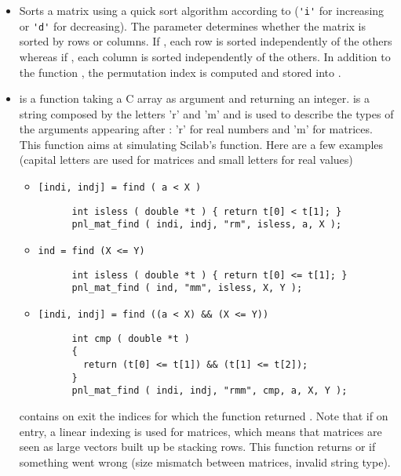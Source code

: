 \begin{itemize}
\item {}
  \sshortdescribe Sorts a matrix using a quick sort algorithm according to
   (\verb!'i'! for increasing or \verb!'d'! for decreasing). The
  parameter  determines whether the matrix is sorted by rows or
  columns. If , each row is sorted independently of the others
  whereas if , each column is sorted independently of the
  others. In addition to the function , the permutation
  index is computed and stored into .

\item {}
  \sshortdescribe {} is a function taking a C array as argument and
  returning an integer.  is a string composed by the letters 'r' and
  'm' and is used to describe the types of the arguments appearing after 
  : 'r' for real numbers and 'm' for matrices.
  This function aims at simulating Scilab's 
  function. Here are a few examples (capital letters are used for matrices and
  small letters for real values)
  \begin{itemize}
    \item \verb![indi, indj] = find ( a < X )!
      \begin{verbatim}
      int isless ( double *t ) { return t[0] < t[1]; }
      pnl_mat_find ( indi, indj, "rm", isless, a, X );
      \end{verbatim}
    \item \verb!ind = find (X <= Y)!
      \begin{verbatim}
      int isless ( double *t ) { return t[0] <= t[1]; }
      pnl_mat_find ( ind, "mm", isless, X, Y );
      \end{verbatim}
    \item \verb![indi, indj] = find ((a < X) && (X <= Y))!
      \begin{verbatim}
      int cmp ( double *t ) 
      { 
        return (t[0] <= t[1]) && (t[1] <= t[2]); 
      }
      pnl_mat_find ( indi, indj, "rmm", cmp, a, X, Y );
      \end{verbatim}
  \end{itemize}
   contains on exit the indices  for which the function 
  returned . Note that if  on entry, a linear indexing
  is used for matrices, which means that matrices are seen as large vectors
  built up be stacking rows. This function returns  or  if
  something went wrong (size mismatch between matrices, invalid string type).
\end{itemize}


